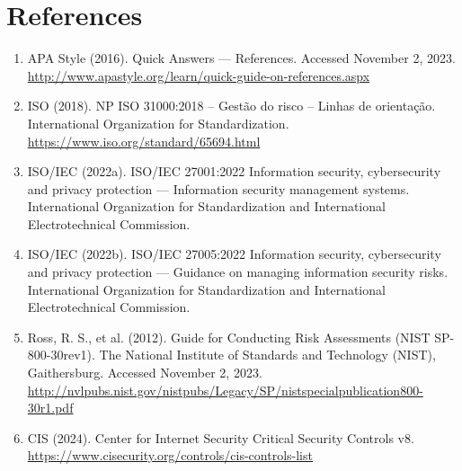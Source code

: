 \chapter{References}

\begin{enumerate}
    \item APA Style (2016). Quick Answers — References. Accessed November 2, 2023. \\
    \url{http://www.apastyle.org/learn/quick-guide-on-references.aspx}
    \item ISO (2018). NP ISO 31000:2018 – Gestão do risco – Linhas de orientação. International Organization for Standardization.\\
    \url{https://www.iso.org/standard/65694.html}
    \item ISO/IEC (2022a). ISO/IEC 27001:2022 Information security, cybersecurity and privacy protection — Information security management systems. International Organization for Standardization and International Electrotechnical Commission.
    \item ISO/IEC (2022b). ISO/IEC 27005:2022 Information security, cybersecurity and privacy protection — Guidance on managing information security risks. International Organization for Standardization and International Electrotechnical Commission.
    \item Ross, R. S., et al. (2012). Guide for Conducting Risk Assessments (NIST SP-800-30rev1). The National Institute of Standards and Technology (NIST), Gaithersburg. Accessed November 2, 2023.\\
    \url{http://nvlpubs.nist.gov/nistpubs/Legacy/SP/nistspecialpublication800-30r1.pdf}
    \item CIS (2024). Center for Internet Security Critical Security Controls v8.\\
    \url{https://www.cisecurity.org/controls/cis-controls-list}
\end{enumerate}